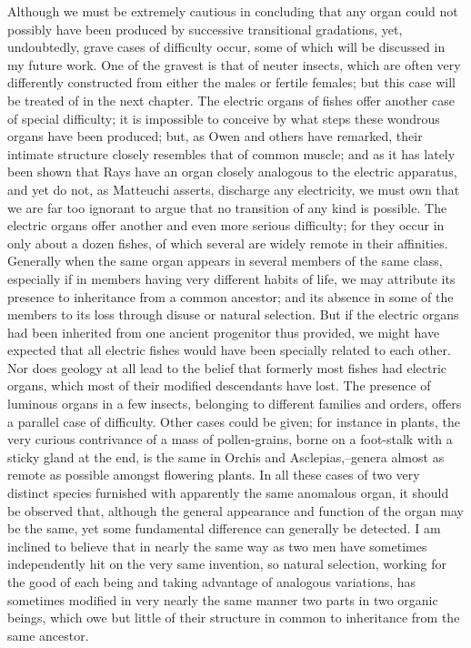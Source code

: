 Although we must be extremely cautious in concluding that any organ could not possibly have been produced by successive transitional gradations, yet, undoubtedly, grave cases of difficulty occur, some of which will be discussed in my future work.
One of the gravest is that of neuter insects, which are often very differently constructed from either the males or fertile females; but this case will be treated of in the next chapter. The electric organs of fishes offer another case of special difficulty; it is impossible to conceive by what steps these wondrous organs have been produced; but, as Owen and others have remarked, their intimate structure closely resembles that of common muscle; and as it has lately been shown that Rays have an organ closely analogous to the electric apparatus, and yet do not, as Matteuchi asserts, discharge any electricity, we must own that we are far too ignorant to argue that no transition of any kind is possible.
The electric organs offer another and even more serious difficulty; for they occur in only about a dozen fishes, of which several are widely remote in their affinities. Generally when the same organ appears in several members of the same class, especially if in members having very different habits of life, we may attribute its presence to inheritance from a common ancestor; and its absence in some of the members to its loss through disuse or natural selection. But if the electric organs had been inherited from one ancient progenitor thus provided, we might have expected that all electric fishes would have been specially related to each other. Nor does geology at all lead to the belief that formerly most fishes had electric organs, which most of their modified descendants have lost. The presence of luminous organs in a few insects, belonging to different families and orders, offers a parallel case of difficulty. Other cases could be given; for instance in plants, the very curious contrivance of a mass of pollen-grains, borne on a foot-stalk with a sticky gland at the end, is the same in Orchis and Asclepias,--genera almost as remote as possible amongst flowering plants. In all these cases of two very distinct species furnished with apparently the same anomalous organ, it should be observed that, although the general appearance and function of the organ may be the same, yet some fundamental difference can generally be detected. I am inclined to believe that in nearly the same way as two men have sometimes independently hit on the very same invention, so natural selection, working for the good of each being and taking advantage of analogous variations, has sometimes modified in very nearly the same manner two parts in two organic beings, which owe but little of their structure in common to inheritance from the same ancestor.
